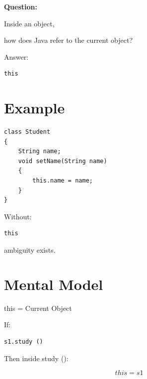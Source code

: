 \documentclass[11pt,a4paper]{book}
\begin{document}
\textbf{Question:}

Inside an object,

how does Java refer to the current object?


Answer:

\begin{verbatim}
this
\end{verbatim}


\section{Example}

\begin{verbatim}
class Student
{
    String name;
    void setName(String name)
    {
        this.name = name;
    }
}
\end{verbatim}


Without:

\begin{verbatim}
this
\end{verbatim}

ambiguity exists.


\section{Mental Model}

\begin{mentalmodel}

this = Current Object

\end{mentalmodel}


If:

\begin{verbatim}
s1.study ()
\end{verbatim}


Then inside study ():

\[
this = s1
\]

\end{document}
